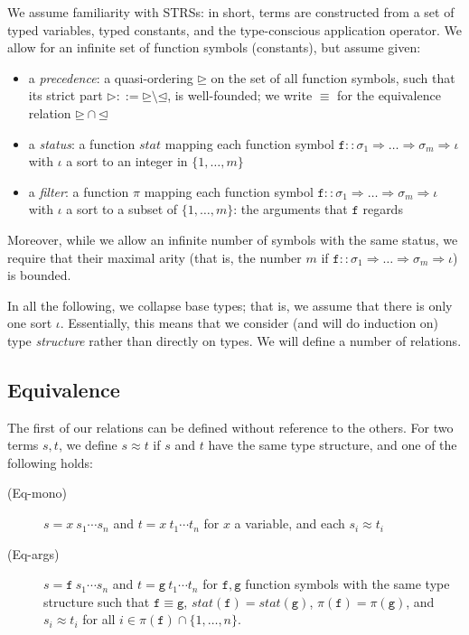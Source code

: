 \documentclass[a4paper,USenglish,cleveref,autoref,thm-restate]{lipics-v2021}
\newcommand{\arrtype}{\Rightarrow}
\newcommand{\ismain}{\approx}
\newcommand{\grpred}{\rhd}
\newcommand{\geqpred}{\unrhd}
\newcommand{\leqpred}{\unlhd}
\newcommand{\eqpred}{\equiv}
\newcommand{\symb}[1]{\mathtt{#1}}
\newcommand{\afun}{\symb{f}}
\newcommand{\bfun}{\symb{g}}
\newcommand{\atype}{\sigma}
\newcommand{\asort}{\iota}
\newcommand{\avar}{x}
\newcommand{\status}{\mathit{stat}}
\newcommand{\filter}{\pi}
\begin{document}
We assume familiarity with STRSs: in short, terms are constructed from a set of typed variables,
typed constants, and the type-conscious application operator.  We allow for an infinite set of
function symbols (constants), but assume given:
\begin{itemize}
\item a \emph{precedence}: a quasi-ordering $\geqpred$ on the set of all function symbols, such
  that its strict part $\grpred ::= \geqpred \setminus \leqpred$, is well-founded;
  we write $\eqpred$ for the equivalence relation $\geqpred \cap \leqpred$  
\item a \emph{status}: a function $\status$ mapping each function symbol $\afun ::
  \atype_1 \arrtype \dots \arrtype \atype_m \arrtype \asort$ with $\asort$ a sort to an integer
  in $\{1,\dots,m\}$
\item a \emph{filter}: a function $\filter$ mapping each function symbol $\afun :: \atype_1
  \arrtype \dots \arrtype \atype_m \arrtype \asort$ with $\asort$ a sort to a subset of
  $\{1,\dots,m\}$: the arguments that $\afun$ regards
\end{itemize}
Moreover, while we allow an infinite number of symbols with the same status, we require that their
maximal arity (that is, the number $m$ if $\afun :: \atype_1 \arrtype \dots \arrtype \atype_m
\arrtype \asort$) is bounded.

\medskip
In all the following, we collapse base types; that is, we assume that there is only one sort
$\asort$.  Essentially, this means that we consider (and will do induction on) type \emph{structure}
rather than directly on types.
We will define a number of relations.

\subsection{Equivalence}
The first of our relations can be defined without reference to the others.
For two terms $s,t$, we define $s \ismain t$ if $s$ and $t$ have the same type structure, and one of
the following holds:
\begin{description}
\item[(Eq-mono)] $s = \avar\ s_1 \cdots s_n$ and $t = \avar\ t_1 \cdots t_n$ for $\avar$ a variable,
  and each $s_i \ismain t_i$
\item[(Eq-args)] $s = \afun\ s_1 \cdots s_n$ and $t = \bfun\ t_1 \cdots t_n$ for $\afun,\bfun$
  function symbols with the same type structure such that
  $\afun \eqpred \bfun$,
  $\status(\afun) = \status(\bfun)$,
  $\filter(\afun) = \filter(\bfun)$, and 
  $s_i \ismain t_i$ for all $i \in \filter(\afun) \cap \{1,\dots,n\}$.
\end{description}
\end{document}

